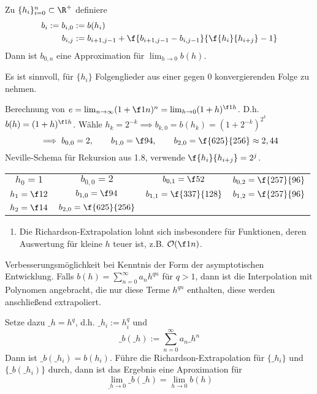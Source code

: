 \documentclass[11pt]{scrartcl}
\begin{document}
\begin{df} \label{1.8}
	Zu $\{h_i\}_{i=0}^n \subset \R^+$ definiere
	\begin{align*}
		b_i := b_{i,0} &:= b(h_i)\\
		b_{i,j} &:= b_{i+1,j-1} + \f {b_{i+1,j-1}-b_{i,j-1}}{\f {h_i}{h_{i+j}}-1}
	\end{align*}
	Dann ist $b_{0,n}$ eine Approximation für $\lim_{h\to 0} b(h)$.
	\begin{note}
		Es ist sinnvoll, für $\{h_i\}$ Folgenglieder aus einer gegen 0 konvergierenden Folge zu nehmen.
	\end{note}
\end{df}

\begin{ex*}
	Berechnung von $e=\lim_{n\to \infty} (1 +\f 1n)^n = \lim_{h\to 0} (1+h)^{\f 1h}$.
	D.h. $b(h)=(1+h)^{\f 1h}$.
	Wähle $h_k=2^{-k} \implies b_{k,0}=b(h_k) = (1+2^{-k})^{2^k}$
	\[
		\implies b_{0,0} = 2, \qquad b_{1,0} = \f 94, \qquad b_{2,0} = \f {625}{256} \approx 2,44
	\]
	Neville-Schema für Rekursion aus 1.8, verwende $\f {h_i}{h_{i+j}} = 2^j$.
	\begin{table}[!ht]
		\centering
		\begin{tabular}{c|ccc}
			$h_0=1$ & $b_{0,0}=2$  & $b_{0,1}=\f 52$ & $b_{0,2}=\f {257}{96}$\\
			$h_1=\f12$ & $b_{1,0}=\f 94$  & $b_{1,1}=\f {337}{128}$ & $b_{1,2}=\f {257}{96}$\\
			$h_2=\f14$ & $b_{2,0}=\f {625}{256}$  \\
		\end{tabular}
	\end{table}
\end{ex*}

\begin{note}
	\begin{enumerate}
		\item 
			Die Richardson-Extrapolation lohnt sich insbesondere für Funktionen, deren Auswertung für kleine $h$ teuer ist, z.B. $\mathcal O(\f 1n)$.
	\end{enumerate}
\end{note}

\begin{note}
	Verbesserungsmöglichkeit bei Kenntnis der Form der asymptotischen Entwicklung.
	Falls $b(h) = \sum_{n=0}^\infty a_nh^{qn}$ für $q>1$, dann ist die Interpolation mit Polynomen angebracht, die nur diese Terme $h^{qn}$ enthalten, diese werden anschließend extrapoliert.

	Setze dazu $\_h = h^q$, d.h. $\_{h_{i}}:= h_i^q$ und
	\[
		\_b(\_h) := \sum_{n=0}^\infty a_n\_h^n
	\]
	Dann ist $\_b(\_h_i) = b(h_i)$.
	Führe die Richardson-Extrapolation für $\{\_h_i\}$ und $\{\_b(\_h_i)\}$ durch, dann ist das Ergebnis eine Aproximation für
	\[
		\lim_{\_h\to 0}\_b(\_h) = \lim_{h\to 0}b(h)
	\]
\end{note}
\end{document}
